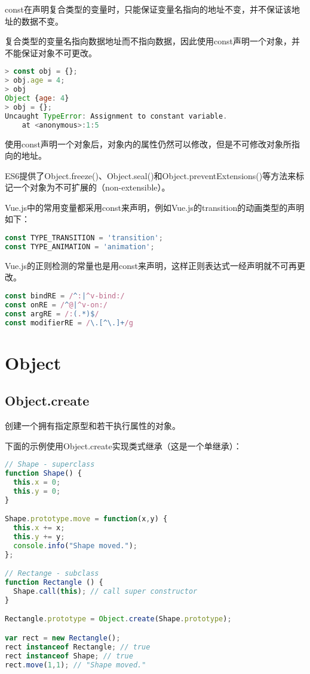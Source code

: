 const在声明复合类型的变量时，只能保证变量名指向的地址不变，并不保证该地址的数据不变。

复合类型的变量名指向数据地址而不指向数据，因此使用const声明一个对象，并不能保证对象不可更改。






\begin{lstlisting}[language=JavaScript]
> const obj = {};
> obj.age = 4;
> obj
Object {age: 4}
> obj = {};
Uncaught TypeError: Assignment to constant variable.
    at <anonymous>:1:5
\end{lstlisting}

使用const声明一个对象后，对象内的属性仍然可以修改，但是不可修改对象所指向的地址。

ES6提供了Object.freeze()、Object.seal()和Object.preventExtensions()等方法来标记一个对象为不可扩展的（non-extensible）。

Vue.js中的常用变量都采用const来声明，例如Vue.js的transition的动画类型的声明如下：


\begin{lstlisting}[language=JavaScript]
const TYPE_TRANSITION = 'transition';
const TYPE_ANIMATION = 'animation';
\end{lstlisting}

Vue.js的正则检测的常量也是用const来声明，这样正则表达式一经声明就不可再更改。







\begin{lstlisting}[language=JavaScript]
const bindRE = /^:|^v-bind:/
const onRE = /^@|^v-on:/
const argRE = /:(.*)$/
const modifierRE = /\.[^\.]+/g
\end{lstlisting}



\chapter{Object}


\section{Object.create}

创建一个拥有指定原型和若干执行属性的对象。

下面的示例使用Object.create实现类式继承（这是一个单继承）：

\begin{lstlisting}[language=JavaScript]
// Shape - superclass
function Shape() {
  this.x = 0;
  this.y = 0;
}

Shape.prototype.move = function(x,y) {
  this.x += x;
  this.y += y;
  console.info("Shape moved.");
};

// Rectange - subclass
function Rectangle () {
  Shape.call(this); // call super constructor
}

Rectangle.prototype = Object.create(Shape.prototype);

var rect = new Rectangle();
rect instanceof Rectangle; // true
rect instanceof Shape; // true
rect.move(1,1); // "Shape moved."

\end{lstlisting}


